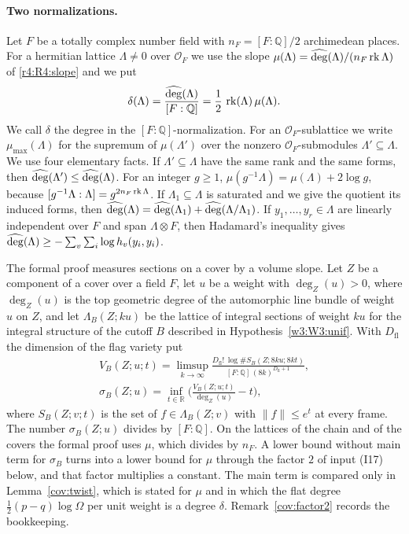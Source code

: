 \paragraph{Two normalizations.}
Let $F$ be a totally complex number field with $n_F=[F:\mathbb Q]/2$ archimedean places. For a hermitian lattice $\Lambda\neq0$ over $\mathcal O_F$ we use the slope $\mu(\Lambda)=\widehat{\deg}(\Lambda)/(n_F\operatorname{rk}\Lambda)$ of \eqref{r4:R4:slope} and we put
\[
\delta(\Lambda)=\frac{\widehat{\deg}(\Lambda)}{[F:\mathbb Q]}=\frac12\,\operatorname{rk}(\Lambda)\,\mu(\Lambda).
\]
We call $\delta$ the degree in the $[F:\mathbb Q]$-normalization. For an $\mathcal O_F$-sublattice we write $\mu_{\max}(\Lambda)$ for the supremum of $\mu(\Lambda')$ over the nonzero $\mathcal O_F$-submodules $\Lambda'\subseteq\Lambda$. We use four elementary facts. If $\Lambda'\subseteq\Lambda$ have the same rank and the same forms, then $\widehat{\deg}(\Lambda')\le\widehat{\deg}(\Lambda)$. For an integer $g\ge1$, $\mu(g^{-1}\Lambda)=\mu(\Lambda)+2\log g$, because $[g^{-1}\Lambda:\Lambda]=g^{2n_F\operatorname{rk}\Lambda}$. If $\Lambda_1\subseteq\Lambda$ is saturated and we give the quotient its induced forms, then $\widehat{\deg}(\Lambda)=\widehat{\deg}(\Lambda_1)+\widehat{\deg}(\Lambda/\Lambda_1)$. If $y_1,\dots,y_r\in\Lambda$ are linearly independent over $F$ and span $\Lambda\otimes F$, then Hadamard's inequality gives $\widehat{\deg}(\Lambda)\ge-\sum_v\sum_i\log h_v(y_i,y_i)$.

The formal proof measures sections on a cover by a volume slope. Let $Z$ be a component of a cover over a field $F$, let $u$ be a weight with $\deg_Z(u)>0$, where $\deg_Z(u)$ is the top geometric degree of the automorphic line bundle of weight $u$ on $Z$, and let $\Lambda_B(Z;ku)$ be the lattice of integral sections of weight $ku$ for the integral structure of the cutoff $B$ described in Hypothesis~\ref{w3:W3:unif}. With $D_{\mathrm{fl}}$ the dimension of the flag variety put
\begin{gather*}
V_B(Z;u;t)=\limsup_{k\to\infty}\frac{D_{\mathrm{fl}}!\,\log\#S_B(Z;8ku;8kt)}{[F:\mathbb Q]\,(8k)^{D_{\mathrm{fl}}+1}},\\
\sigma_B(Z;u)=\inf_{t\in\mathbb R}\Big(\frac{V_B(Z;u;t)}{\deg_Z(u)}-t\Big),
\end{gather*}
where $S_B(Z;v;t)$ is the set of $f\in\Lambda_B(Z;v)$ with $\lVert f\rVert\le e^{t}$ at every frame.
The number $\sigma_B(Z;u)$ divides by $[F:\mathbb Q]$. On the lattices of the chain and of the covers the formal proof uses $\mu$, which divides by $n_F$. A lower bound without main term for $\sigma_B$ turns into a lower bound for $\mu$ through the factor $2$ of input (I17) below, and that factor multiplies a constant. The main term is compared only in Lemma~\ref{cov:twist}, which is stated for $\mu$ and in which the flat degree $\frac12(p-q)\log\Omega$ per unit weight is a degree $\delta$. Remark~\ref{cov:factor2} records the bookkeeping.

